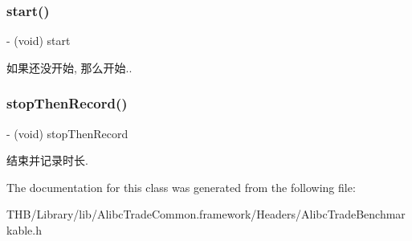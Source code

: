 \subsubsection{\texorpdfstring{start()}{start()}}
{\footnotesize\ttfamily -\/ (void) start \begin{DoxyParamCaption}{ }\end{DoxyParamCaption}}

如果还没开始, 那么开始.. \mbox{\label{interface_alibc_trade_time_measure_ad3bd1ef0cba36ac5f948c8c60227bf60}} 
\subsubsection{\texorpdfstring{stop\+Then\+Record()}{stopThenRecord()}}
{\footnotesize\ttfamily -\/ (void) stop\+Then\+Record \begin{DoxyParamCaption}{ }\end{DoxyParamCaption}}

结束并记录时长. 

The documentation for this class was generated from the following file\+:\begin{DoxyCompactItemize}
\item 
T\+H\+B/\+Library/lib/\+Alibc\+Trade\+Common.\+framework/\+Headers/Alibc\+Trade\+Benchmarkable.\+h\end{DoxyCompactItemize}
